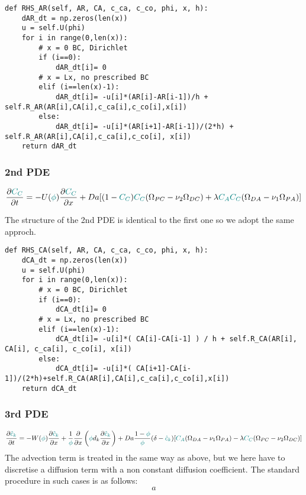 \documentclass[a4paper]{article}
\begin{document}
\begin{lstlisting}
def RHS_AR(self, AR, CA, c_ca, c_co, phi, x, h):
    dAR_dt = np.zeros(len(x))
    u = self.U(phi)
    for i in range(0,len(x)):
        # x = 0 BC, Dirichlet
        if (i==0):
            dAR_dt[i]= 0
        # x = Lx, no prescribed BC
        elif (i==len(x)-1):
            dAR_dt[i]= -u[i]*(AR[i]-AR[i-1])/h + self.R_AR(AR[i],CA[i],c_ca[i],c_co[i],x[i])
        else:
            dAR_dt[i]= -u[i]*(AR[i+1]-AR[i-1])/(2*h) + self.R_AR(AR[i],CA[i],c_ca[i],c_co[i], x[i])    
    return dAR_dt
\end{lstlisting}

\subsubsection*{2nd PDE}
\[
\frac{\partial {\color{teal}C_C}}{\partial t} 
= -U({\color{teal}\phi}) \frac{\partial {\color{teal}C_C}}{\partial x}  
+ Da[(1-{\color{teal}C_C}){\color{teal}C_C}(\Omega_{PC}-\nu_2\Omega_{DC})+
\lambda {\color{teal}C_AC_C} (\Omega_{DA}-\nu_1\Omega_{PA})]
\]

The structure of the 2nd PDE is identical to the first one so we adopt the same approch.
\begin{lstlisting}
def RHS_CA(self, AR, CA, c_ca, c_co, phi, x, h):
    dCA_dt = np.zeros(len(x))
    u = self.U(phi)
    for i in range(0,len(x)):
        # x = 0 BC, Dirichlet
        if (i==0):
            dCA_dt[i]= 0
        # x = Lx, no prescribed BC
        elif (i==len(x)-1):
            dCA_dt[i]= -u[i]*( CA[i]-CA[i-1] ) / h + self.R_CA(AR[i], CA[i], c_ca[i], c_co[i], x[i])
        else:
            dCA_dt[i]= -u[i]*( CA[i+1]-CA[i-1])/(2*h)+self.R_CA(AR[i],CA[i],c_ca[i],c_co[i],x[i])
    return dCA_dt
\end{lstlisting}

\subsubsection*{3rd PDE}

\[
\frac{\partial {\color{teal}\hat{c}_k}}{\partial t} 
= -W({\color{teal}\phi}) \frac{\partial {\color{teal}\hat{c}_k}}{\partial x}
+\frac{1}{\color{teal}\phi} \frac{\partial}{\partial x} 
\left( {\color{teal}\phi} d_k \frac{\partial {\color{teal}\hat{c}_k}}{\partial x} \right)
+Da \frac{1-{\color{teal}\phi}}{{\color{teal}\phi}}(\delta-{\color{teal}\hat{c}_k})
[{\color{teal}C_A}(\Omega_{DA}-\nu_1\Omega_{PA})-\lambda 
{\color{teal}C_C} (\Omega_{PC}-\nu_2 \Omega_{DC})  ]
\]
The advection term is treated in the same way as above, but we here have to discretise 
a diffusion term with a non constant diffusion coefficient.
The standard procedure in such cases is as follows:
\[
a
\] 
\end{document}
